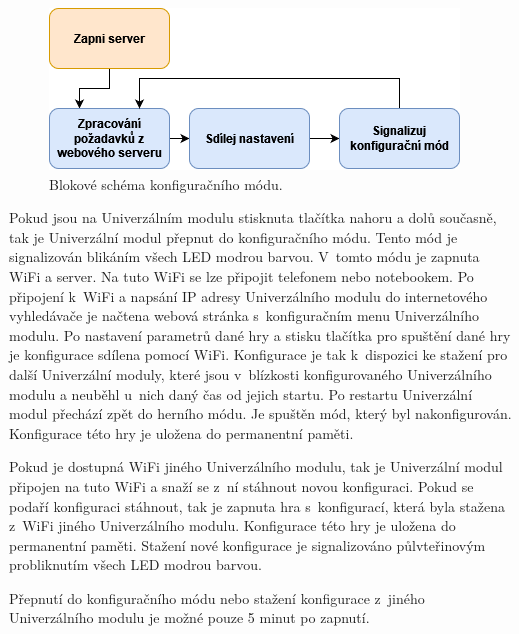 \begin{figure}[!h]
  \begin{center}
    \includegraphics[scale=0.8]{obrazky/blokove_schema_modu_CONFIGURATION.png}
  \end{center}
  \caption[Blokové schéma konfiguračního módu]{Blokové schéma konfiguračního módu.}
\end{figure}

Pokud jsou na Univerzálním modulu stisknuta tlačítka nahoru a dolů současně, tak je Univerzální modul přepnut do konfiguračního módu. Tento mód je signalizován blikáním všech LED modrou barvou. V~tomto módu je zapnuta WiFi a server. Na 
tuto WiFi se lze připojit telefonem nebo notebookem. Po připojení k~WiFi a napsání IP adresy Univerzálního modulu do internetového vyhledávače je načtena webová stránka s~konfiguračním menu Univerzálního modulu. Po nastavení parametrů 
dané hry a stisku 
tlačítka pro spuštění dané hry je konfigurace sdílena pomocí WiFi. Konfigurace je tak k~dispozici ke stažení pro další Univerzální moduly, které jsou v~blízkosti konfigurovaného Univerzálního modulu a neuběhl u~nich daný čas od jejich 
startu. Po restartu Univerzální modul přechází zpět do herního módu. Je spuštěn mód, který byl nakonfigurován. Konfigurace této hry je uložena do permanentní paměti.

Pokud je dostupná WiFi jiného Univerzálního modulu, tak je Univerzální modul připojen na tuto WiFi a snaží se z~ní stáhnout novou konfiguraci. Pokud se podaří konfiguraci stáhnout, tak je zapnuta hra s~konfigurací,
která byla stažena z~WiFi jiného Univerzálního modulu. Konfigurace této hry je uložena do permanentní paměti. Stažení nové konfigurace je signalizováno půlvteřinovým probliknutím všech LED modrou barvou. 

Přepnutí do konfiguračního módu nebo stažení konfigurace z~jiného Univerzálního modulu je možné pouze 5 minut po zapnutí. 

